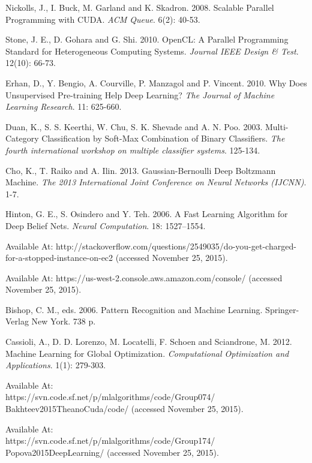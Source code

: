 \documentclass[12pt,notitlepage]{article}
\begin{document}
\begin{thebibliography}{10}
{Nickolls, J., I. Buck, M. Garland and K. Skadron.}
2008. Scalable Parallel Programming with CUDA. \emph{ACM Queue}. 6(2): 40-53.

{Stone, J. E., D. Gohara and G. Shi.}
2010. OpenCL: A Parallel Programming Standard for Heterogeneous Computing Systems.
\emph{Journal
IEEE Design \& Test}. 12(10): 66-73.

{Erhan, D., 
Y. Bengio,
A. Courville,
P. Manzagol and 
P. Vincent.}
2010. Why Does Unsupervised Pre-training Help Deep Learning? \emph{The Journal of Machine Learning Research}. 11: 625-660.


{ Duan, K., S. S. Keerthi, W. Chu, S. K. Shevade and A. N. 
Poo.}
2003. Multi-Category Classification by Soft-Max
Combination of Binary Classifiers. \emph{The
fourth international workshop on multiple classifier systems}. 125-134.


{Cho, K., T. Raiko and A. Ilin.}
2013. Gaussian-Bernoulli Deep Boltzmann Machine. \emph{The 2013 International Joint Conference on Neural Networks (IJCNN)}. 1-7. 

{Hinton, G. E., S. Osindero and Y. Teh.}
2006. A Fast Learning Algorithm for Deep Belief Nets. \emph{Neural Computation}. 18: 1527–1554.

Available At: http://stackoverflow.com/questions/2549035/do-you-get-charged-for-a-stopped-instance-on-ec2 (accessed November 25, 2015).


Available At: https://us-west-2.console.aws.amazon.com/console/ (accessed November 25, 2015).

{Bishop, C. M.,}
eds. 2006. Pattern Recognition and Machine Learning. Springer-Verlag New York. 738 p.


{Cassioli, A., D. D. Lorenzo, M. Locatelli, F. Schoen and Sciandrone, M.}
2012. Machine Learning for Global Optimization. \emph{Computational Optimization and Applications}. 1(1): 279-303.


Available At: \\ https://svn.code.sf.net/p/mlalgorithms/code/Group074/\\Bakhteev2015TheanoCuda/code/ (accessed November 25, 2015).


Available At: \\https://svn.code.sf.net/p/mlalgorithms/code/Group174/\\Popova2015DeepLearning/ (accessed November 25, 2015).
\end{thebibliography}
\end{document}
